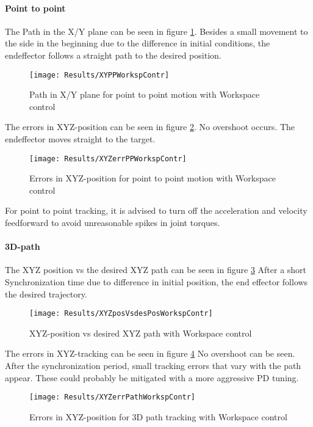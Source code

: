 \paragraph{Point to point}
The Path in the X/Y plane can be seen in figure  \ref{fig:XYPPWorkspContr}. 
Besides a small movement to the side in the beginning due to the difference in initial conditions, the endeffector follows a straight path to the desired position.
\begin{figure}[H]
	\texttt{[image: Results/XYPPWorkspContr]}
	\caption{Path in X/Y plane for point to point motion with Workspace control}
	\label{fig:XYPPWorkspContr}
\end{figure}
The errors in XYZ-position can be seen in figure \ref{fig:XYZerrPPWorkspContr}.
No overshoot occurs. The endeffector moves straight to the target.
\begin{figure}[H]
	\texttt{[image: Results/XYZerrPPWorkspContr]}
	\caption{Errors in XYZ-position for point to point motion with Workspace control}
	\label{fig:XYZerrPPWorkspContr}
\end{figure}

For point to point tracking, it is advised to turn off the acceleration and velocity feedforward to avoid unreasonable spikes in joint torques.

\paragraph{3D-path}
The XYZ position vs the desired XYZ path can be seen in figure \ref{fig:XYZposVsdesPosWorkspContr}
After a short Synchronization time due to difference in initial position, the end effector follows the desired trajectory.
\begin{figure}[H]
	\texttt{[image: Results/XYZposVsdesPosWorkspContr]}
	\caption{XYZ-position vs desired XYZ path with Workspace control}
	\label{fig:XYZposVsdesPosWorkspContr}
\end{figure}
The errors in XYZ-tracking can be seen in figure \ref{fig:XYZerrPathWorkspContr}
No overshoot can be seen. After the synchronization period, small tracking errors that vary with the path appear. These could probably be mitigated with a more aggressive PD tuning.
\begin{figure}[H]
	\texttt{[image: Results/XYZerrPathWorkspContr]}
	\caption{Errors in XYZ-position for 3D path tracking with Workspace control}
	\label{fig:XYZerrPathWorkspContr}
\end{figure}


